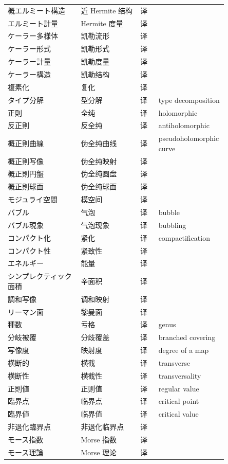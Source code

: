 {\begin{longtable}{p{0.32\linewidth} p{0.26\linewidth} p{0.08\linewidth} p{0.19\linewidth}}
概エルミート構造 & 近 Hermite 结构 & 译 &  \\
エルミート計量 & Hermite 度量 & 译 &  \\
ケーラー多様体 & 凯勒流形 & 译 &  \\
ケーラー形式 & 凯勒形式 & 译 &  \\
ケーラー計量 & 凯勒度量 & 译 &  \\
ケーラー構造 & 凯勒结构 & 译 &  \\
複素化 & 复化 & 译 &  \\
タイプ分解 & 型分解 & 译 & type decomposition \\
正則 & 全纯 & 译 & holomorphic \\
反正則 & 反全纯 & 译 & antiholomorphic \\
概正則曲線 & 伪全纯曲线 & 译 & pseudoholomorphic curve \\
概正則写像 & 伪全纯映射 & 译 &  \\
概正則円盤 & 伪全纯圆盘 & 译 &  \\
概正則球面 & 伪全纯球面 & 译 &  \\
モジュライ空間 & 模空间 & 译 &  \\
バブル & 气泡 & 译 & bubble \\
バブル現象 & 气泡现象 & 译 & bubbling \\
コンパクト化 & 紧化 & 译 & compactification \\
コンパクト性 & 紧致性 & 译 &  \\
エネルギー & 能量 & 译 &  \\
シンプレクティック面積 & 辛面积 & 译 &  \\
調和写像 & 调和映射 & 译 &  \\
リーマン面 & 黎曼面 & 译 &  \\
種数 & 亏格 & 译 & genus \\
分岐被覆 & 分歧覆盖 & 译 & branched covering \\
写像度 & 映射度 & 译 & degree of a map \\
横断的 & 横截 & 译 & transverse \\
横断性 & 横截性 & 译 & transversality \\
正則値 & 正则值 & 译 & regular value \\
臨界点 & 临界点 & 译 & critical point \\
臨界値 & 临界值 & 译 & critical value \\
非退化臨界点 & 非退化临界点 & 译 &  \\
モース指数 & Morse 指数 & 译 &  \\
モース理論 & Morse 理论 & 译 &  \\

\end{longtable}}

